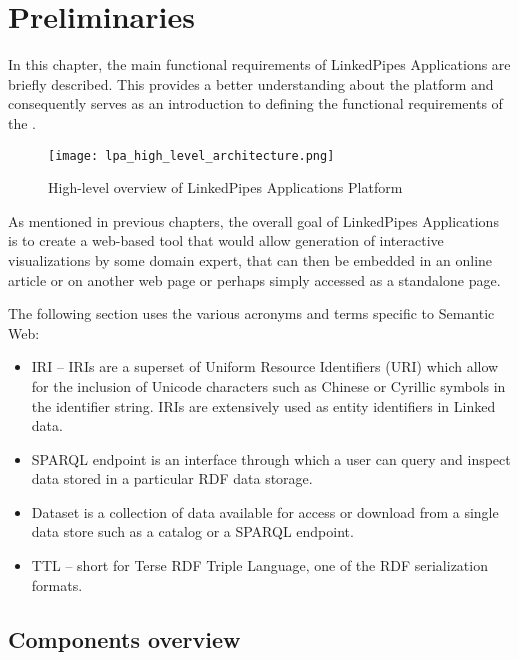 \chapter{Preliminaries}
\label{chap:num_1}

In this chapter, the main functional requirements of LinkedPipes Applications are briefly described. This provides a better understanding about the platform and consequently serves as an introduction to defining the functional requirements of the \lpa{}.


\begin{figure}[h]

\centering
\texttt{[image: lpa\_high\_level\_architecture.png]}
\caption{High-level overview of LinkedPipes Applications Platform}
\label{fig:high-level-arch}
\end{figure}

As mentioned in previous chapters, the overall goal of LinkedPipes Applications is to create a web-based tool that would allow generation of interactive visualizations by some domain expert, that can then be embedded in an online article or on another web page or perhaps simply accessed as a standalone page.

The following section uses the various acronyms and terms specific to Semantic Web: 

\begin{itemize}
    \item \gls{IRI} -- IRIs are a superset of Uniform Resource Identifiers (URI) which allow for the inclusion of Unicode characters such as Chinese or Cyrillic symbols in the identifier string. IRIs are extensively used as entity identifiers in Linked data.
    \item SPARQL endpoint is an interface through which a user can query and inspect data stored in a particular RDF data storage.
    \item Dataset is a collection of data available for access or download from a single data store such as a catalog or a SPARQL endpoint.
    \item TTL -- short for Terse RDF Triple Language, one of the RDF serialization formats.
\end{itemize}

\section{Components overview}

